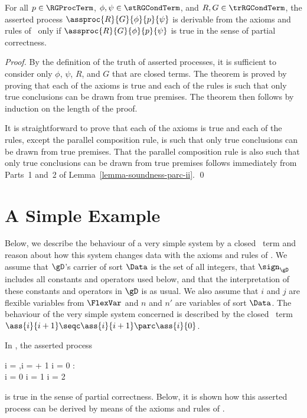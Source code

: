 \documentclass[runningheads]{llncs}
\begin{document}
\begin{theorem}[Soundness]
\label{theorem-soundness-RG}
For all $p \in \RGProcTerm$, $\phi,\psi \in \stRGCondTerm$, and 
$R,G \in \trRGCondTerm$, the asserted process 
$\assproc{R}{G}{\phi}{p}{\psi}$ is derivable from the axioms and rules 
of \RG\ only if $\assproc{R}{G}{\phi}{p}{\psi}$ is true in the sense of 
partial correctness.
\end{theorem}
\begin{proof} 
By the definition of the truth of asserted processes, it is sufficient 
to consider only $\phi$, $\psi$, $R$, and $G$ that are closed terms.
%
The theorem is proved by proving that each of the axioms is true and
each of the rules is such that only true conclusions can be drawn from 
true premises.   
The theorem then follows by induction on the length of the proof.

It is straightforward to prove that each of the axioms is true and
each of the rules, except the parallel composition rule, is such that 
only true conclusions can be drawn from true premises.   
%
That the parallel composition rule is also such that only true 
conclusions can be drawn from true premises follows immediately from 
Parts~1 and~2 of Lemma~\ref{lemma-soundness-parc-ii}.
\qed
\end{proof}

\section{A Simple Example}
\label{sect-example}

Below, we describe the behaviour of a very simple system by a closed 
\deACPei\ \linebreak[2]term and reason about how this system changes 
data with the axioms and rules of \RG.
We assume that $\gD$'s carrier of sort $\Data$ is the set of all 
integers, that $\sign_\gD$ includes all constants and operators used 
below, and that the interpretation of these constants and operators in
$\gD$ is as usual.
We also assume that $i$ and $j$ are flexible variables from $\FlexVar$ 
and $n$ and $n'$ are variables of sort $\Data$.
%
The behaviour of the very simple system concerned is described by the 
closed \deACPei\ term 
$\ass{i}{i+1} \seqc \ass{i}{i+1} \parc \ass{i}{0}$. 

In \RG, the asserted process
\begin{ldispl}
\langle i = ,i =  + 1 \Lor i = 0 \rangle : 
\\ \qquad
{}
  {i = 0 \Lor i = 1 \Lor i = 2}
\end{ldispl}%
is true in the sense of partial correctness.
Below, it is shown how this asserted process can be derived by means of 
the axioms and rules of \RG.
\end{document}
